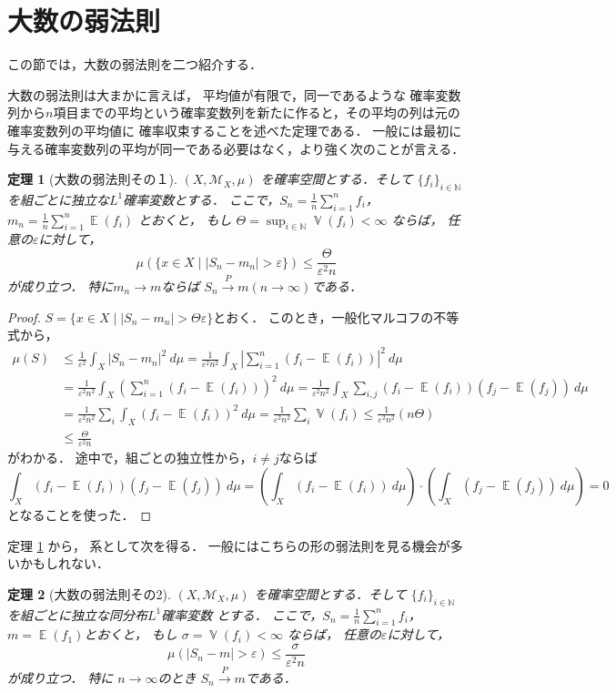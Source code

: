 \documentclass[leqno, a4paper, 12pt]{jsarticle}
\newtheorem{thm}{定理}
\newcommand{\nn}{\mathbb{N}}
\newcommand{\ep}{\varepsilon}
\DeclareMathOperator{\mean}{\mathbb{E}}
\DeclareMathOperator{\varian}{\mathbb{V}}
\begin{document}
\section{大数の弱法則}

この節では，大数の弱法則を二つ紹介する．

大数の弱法則は大まかに言えば，
平均値が有限で，同一であるような
確率変数列から$n$項目までの平均という確率変数列を新たに作ると，その平均の列は元の確率変数列の平均値に
確率収束することを述べた定理である．
一般には最初に与える確率変数列の平均が同一である必要はなく，より強く次のことが言える．

\begin{thm}[大数の弱法則その１]\label{thm:weaklaw1}
$(X, \mathcal{M}_X, \mu)$
を確率空間とする．そして
$\{f_i\}_{i\in \nn}$を組ごとに独立な$L^1$確率変数とする．
ここで，$S_n=\frac{1}{n}\sum_{i=1}^nf_i$，
$m_n=\frac{1}{n}\sum_{i=1}^n\mean(f_i)$
とおくと，
もし
$\Theta=\sup_{i\in \nn}\varian(f_i)<\infty$
ならば，
任意の$\ep$に対して，
\[
\mu(\{x\in X\mid |S_n-m_n|> \ep\})\le \frac{\Theta}{\ep^2 n}
\]
が成り立つ．
特に$m_n\to m$ならば
$S_n\xrightarrow{P} m (n\to \infty)$である．　
\end{thm}
\begin{proof}
$S=\{x\in X\mid |S_n-m_n|>\Theta \ep\}$とおく．
このとき，一般化マルコフの不等式から，
\begin{align*}
\mu(S)&\le 
\frac{1}{\ep^2}\int_{X}|S_n-m_n|^2\ d\mu
=
\frac{1}{\ep^2n^2}\int_{X}
\left|\sum_{i=1}^n(f_i-\mean(f_i))\right|^2\ d\mu\\
&=
\frac{1}{\ep^2n^2}\int_{X}\left(\sum_{i=1}^n
(f_i-\mean(f_i))\right)^2\ d\mu
=
\frac{1}{\ep^2n^2}\int_{X}\sum_{i, j}
(f_i-\mean(f_i))(f_j-\mean(f_j))\ d\mu\\
&
=\frac{1}{\ep^2n^2}\sum_i\int_{X}(f_i-\mean(f_i))^2\ d\mu
=\frac{1}{\ep^2n^2}\sum_{i}\varian(f_i)\le \frac{1}{\ep^2n^2}(n\Theta)\\
&\le \frac{\Theta}{\ep^2 n}
\end{align*}
がわかる．
途中で，組ごとの独立性から，$i\neq j$ならば
\[
\int_X(f_{i}-\mean(f_{i}))(f_{j}-\mean(f_{j}))\ d\mu
=\left(\int_X(f_{i}-\mean(f_{i}))\ d\mu\right)\cdot
\left(\int_X(f_{j}-\mean(f_{j}))\ d\mu\right)
=
0
\]
となることを使った．
\end{proof}

定理 \ref{thm:weaklaw1} から，
系として次を得る．
一般にはこちらの形の弱法則を見る機会が多いかもしれない．
\begin{thm}[大数の弱法則その2]\label{thm:weaklaw2}
$(X, \mathcal{M}_X, \mu)$
を確率空間とする．そして
$\{f_i\}_{i\in \nn}$を組ごとに独立な同分布$L^1$確率変数
とする．
ここで，$S_n=\frac{1}{n}\sum_{i=1}^nf_i$，
$m=\mean(f_1)$とおくと，
もし
$\sigma=\varian(f_i)<\infty$
ならば，
任意の$\ep$に対して，
\[
\mu(|S_n-m|>\ep)\le \frac{\sigma}{\ep^2 n}
\]
が成り立つ．
特に
$n\to \infty$のとき
$S_n\xrightarrow{P} m$である．
\end{thm}
\end{document}
